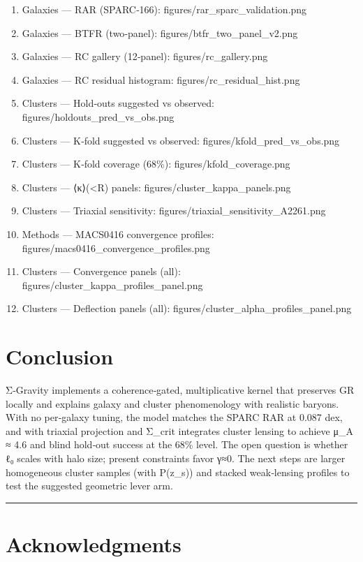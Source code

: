 \documentclass[11pt,a4paper]{article}
\begin{document}
\begin{enumerate}
\item Galaxies — RAR (SPARC‑166): figures/rar\_sparc\_validation.png
\item Galaxies — BTFR (two‑panel): figures/btfr\_two\_panel\_v2.png
\item Galaxies — RC gallery (12‑panel): figures/rc\_gallery.png
\item Galaxies — RC residual histogram: figures/rc\_residual\_hist.png
\item Clusters — Hold‑outs suggested vs observed: figures/holdouts\_pred\_vs\_obs.png
\item Clusters — K‑fold suggested vs observed: figures/kfold\_pred\_vs\_obs.png
\item Clusters — K‑fold coverage (68\%): figures/kfold\_coverage.png
\item Clusters — ⟨κ⟩(<R) panels: figures/cluster\_kappa\_panels.png
\item Clusters — Triaxial sensitivity: figures/triaxial\_sensitivity\_A2261.png
\item Methods — MACS0416 convergence profiles: figures/macs0416\_convergence\_profiles.png
\item Clusters — Convergence panels (all): figures/cluster\_kappa\_profiles\_panel.png
\item Clusters — Deflection panels (all): figures/cluster\_alpha\_profiles\_panel.png
\end{enumerate}


\section{Conclusion}


Σ‑Gravity implements a coherence‑gated, multiplicative kernel that preserves GR locally and explains galaxy and cluster phenomenology with realistic baryons. With no per‑galaxy tuning, the model matches the SPARC RAR at 0.087 dex, and with triaxial projection and Σ\_crit integrates cluster lensing to achieve μ\_A ≈ 4.6 and blind hold‑out success at the 68\% level. The open question is whether ℓ₀ scales with halo size; present constraints favor γ≈0. The next steps are larger homogeneous cluster samples (with P(z\_s)) and stacked weak‑lensing profiles to test the suggested geometric lever arm.


\medskip\hrule\medskip


\section{Acknowledgments}
\end{document}
